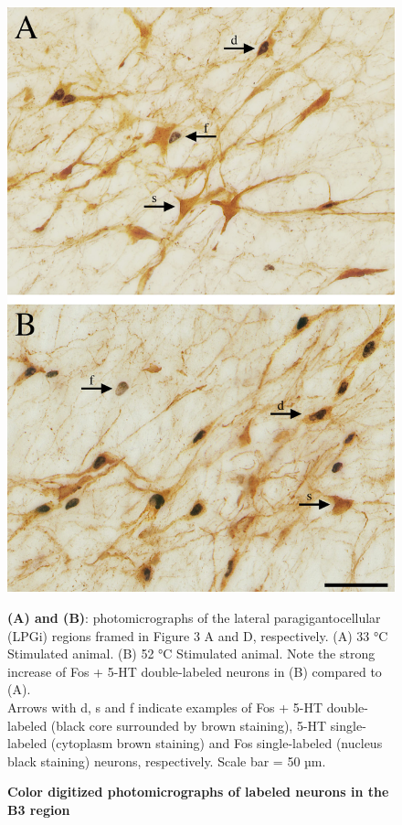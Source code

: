 \documentclass[a4paper,12pt,twoside]{report}
\begin{document}
\begin{figure}[p]

\begin{center}
 \includegraphics[scale=1.5]{Article2-FIG4.jpg} 
\end{center}

\caption{\textbf{Color digitized photomicrographs of labeled neurons in the B3 region}}

{\protect\parbox[t]{18cm}{
\begin{small}
\textbf{(A) and (B)}: photomicrographs of the lateral paragigantocellular (LPGi) regions framed in Figure 3 A and D, respectively. (A) 33 °C Stimulated animal. (B) 52 °C Stimulated animal. Note the strong increase of Fos + 5-HT double-labeled neurons in (B) compared to (A).\\
Arrows with d, s and f indicate examples of Fos + 5-HT double-labeled (black core surrounded by brown staining), 5-HT single-labeled (cytoplasm brown staining) and Fos single-labeled (nucleus black staining) neurons, respectively. Scale bar = 50 µm.
\end{small}}}

\label{Article2-FIG4}

\end{figure}
\end{document}
